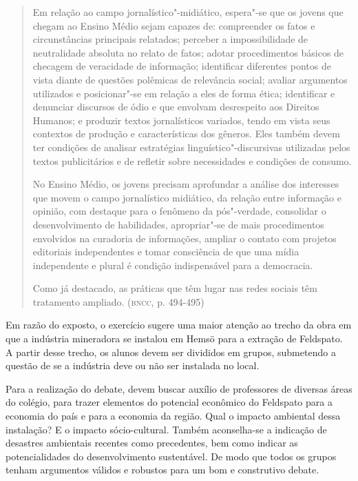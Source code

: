 \documentclass[12pt]{extarticle}
\begin{document}
\begin{quote}
Em relação ao campo jornalístico"-midiático, espera"-se que os jovens
que chegam ao Ensino Médio sejam capazes de: compreender os fatos e
circunstâncias principais relatados; perceber a impossibilidade de
neutralidade absoluta no relato de fatos; adotar procedimentos básicos
de checagem de veracidade de informação; identificar diferentes pontos
de vista diante de questões polêmicas de relevância social; avaliar
argumentos utilizados e posicionar"-se em relação a eles de forma ética;
identificar e denunciar discursos de ódio e que envolvam desrespeito aos
Direitos Humanos; e produzir textos jornalísticos variados, tendo em
vista seus contextos de produção e características dos gêneros. Eles
também devem ter condições de analisar estratégias
linguístico"-discursivas utilizadas pelos textos publicitários e de
refletir sobre necessidades e condições de consumo.

No Ensino Médio, os jovens precisam aprofundar a análise dos interesses
que movem o campo jornalístico midiático, da relação entre informação e
opinião, com destaque para o fenômeno da pós"-verdade, consolidar o
desenvolvimento de habilidades, apropriar"-se de mais procedimentos
envolvidos na curadoria de informações, ampliar o contato com projetos
editoriais independentes e tomar consciência de que uma mídia
independente e plural é condição indispensável para a democracia.

Como já destacado, as práticas que têm lugar nas redes sociais têm
tratamento ampliado. (\textsc{bncc}, p. 494-495)
\end{quote}


Em razão do exposto, o exercício sugere uma maior atenção ao trecho da
obra em que a indústria mineradora se instalou em Hemsö para a
extração de Feldspato. A partir desse trecho, os alunos devem ser
divididos em grupos, submetendo a questão de se a indústria deve ou
não ser instalada no local.

Para a realização do debate, devem buscar auxílio de professores de
diversas áreas do colégio, para trazer elementos do potencial econômico
do Feldspato para a economia do país e para a economia da região. Qual o
impacto ambiental dessa instalação? E o impacto sócio-cultural. Também
aconselha-se a indicação de desastres ambientais recentes como
precedentes, bem como indicar as potencialidades do desenvolvimento
sustentável. De modo que todos os grupos tenham argumentos válidos e
robustos para um bom e construtivo debate.
\end{document}
